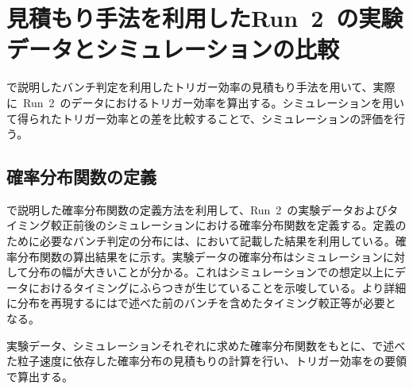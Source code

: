\section{見積もり手法を利用したRun~2~の実験データとシミュレーションの比較}
で説明したバンチ判定を利用したトリガー効率の見積もり手法を用いて、実際に~Run~2~のデータにおけるトリガー効率を算出する。シミュレーションを用いて得られたトリガー効率との差を比較することで、シミュレーションの評価を行う。
\subsection{確率分布関数の定義}
で説明した確率分布関数の定義方法を利用して、Run~2~の実験データおよびタイミング較正前後のシミュレーションにおける確率分布関数を定義する。定義のために必要なバンチ判定の分布には、において記載した結果を利用している。確率分布関数の算出結果をに示す。実験データの確率分布はシミュレーションに対して分布の幅が大きいことが分かる。これはシミュレーションでの想定以上にデータにおけるタイミングにふらつきが生じていることを示唆している。より詳細に分布を再現するにはで述べた前のバンチを含めたタイミング較正等が必要となる。

実験データ、シミュレーションそれぞれに求めた確率分布関数をもとに、で述べた粒子速度に依存した確率分布の見積もりの計算を行い、トリガー効率をの要領で算出する。

